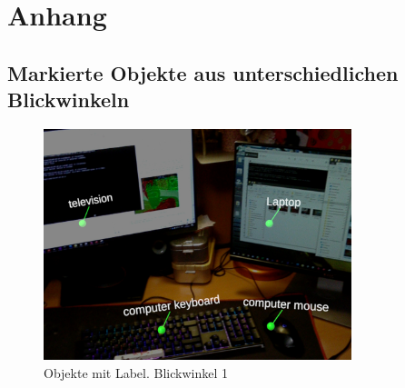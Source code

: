 \section{Anhang}

\subsection{Markierte Objekte aus unterschiedlichen Blickwinkeln}
\label{appendix:blickwinkel}
\begin{figure}[H]
	\centering
	\includegraphics[width=0.8\textwidth]{images/ML_20201014_03.01.45.jpg}
	\caption[Objekte mit Label. Blickwinkel 1]{Objekte mit Label. Blickwinkel 1}
	\label{img:m1}
\end{figure}

